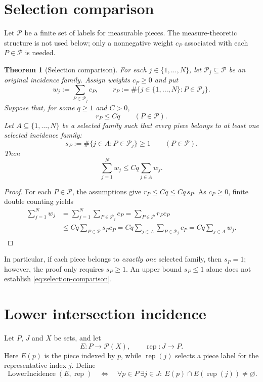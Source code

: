 \documentclass[11pt, letterpaper]{nyjm}
\newtheorem{theorem}{Theorem}[section]
\newcommand{\calP}{\mathcal{P}}
\newcommand{\rep}{\operatorname{rep}}
\newcommand{\LowerIncidence}{\operatorname{LowerIncidence}}
\begin{document}
	\section{Selection comparison}
	
	Let $\calP$ be a finite set of labels for measurable pieces. The
	measure-theoretic structure is not used below; only a nonnegative weight
	$c_P$ associated with each $P\in\calP$ is needed.
	
	\begin{theorem}[Selection comparison]\label{thm:comparison}
		For each $j\in\{1,\ldots,N\}$, let $\calP_j\subseteq\calP$ be an
		original incidence family. Assign weights $c_P\geq 0$ and put
		\[
		w_j:=\sum_{P\in\calP_j}c_P,
		\qquad
		r_P:=\#\bigl\{j\in\{1,\ldots,N\}:P\in\calP_j\bigr\}.
		\]
		Suppose that, for some $q\geq1$ and $C>0$,
		\[
		r_P\leq Cq\qquad(P\in\calP).
		\]
		Let $A\subseteq\{1,\ldots,N\}$ be a selected family such that every
		piece belongs to at least one selected incidence family:
		\[
		s_P:=\#\{j\in A:P\in\calP_j\}\geq1
		\qquad(P\in\calP).
		\]
		Then
		\begin{equation}\label{eq:selection-comparison}
			\boxed{\displaystyle
				\sum_{j=1}^{N}w_j\leq Cq\sum_{j\in A}w_j.}
		\end{equation}
	\end{theorem}
	
	\begin{proof}
		For each $P\in\calP$, the assumptions give
		$r_P\leq Cq\leq Cq\,s_P$. As $c_P\geq0$, finite double counting yields
		\begin{align*}
			\sum_{j=1}^{N}w_j
			&=\sum_{j=1}^{N}\sum_{P\in\calP_j}c_P
			=\sum_{P\in\calP}r_Pc_P\\
			&\leq Cq\sum_{P\in\calP}s_Pc_P
			=Cq\sum_{j\in A}\sum_{P\in\calP_j}c_P
			=Cq\sum_{j\in A}w_j.
		\end{align*}
	\end{proof}
	
	\noindent
	In particular, if each piece belongs to \emph{exactly one} selected
	family, then $s_P=1$; however, the proof only requires $s_P\geq1$.
	An upper bound $s_P\leq1$ alone does not establish
	\eqref{eq:selection-comparison}.
	
	\section{Lower intersection incidence}
	
	Let $P$, $J$ and $X$ be sets, and let
	\[
	E:P\longrightarrow\mathcal P(X),\qquad
	\rep:J\longrightarrow P.
	\]
	Here $E(p)$ is the piece indexed by $p$, while $\rep(j)$ selects a
	piece label for the representative index $j$. Define
	\begin{equation}\label{eq:lower-incidence}
		\LowerIncidence(E,\rep)
		\quad\Longleftrightarrow\quad
		\forall p\in P\ \exists j\in J:\ 
		E(p)\cap E(\rep(j))\ne\varnothing.
	\end{equation}
	
\end{document}
